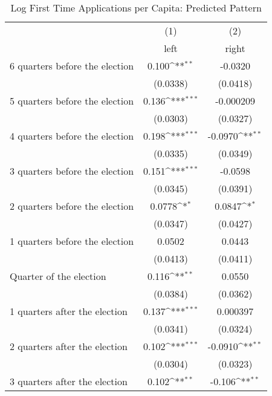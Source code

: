 \begin{table}[htbp]\centering
\def\sym#1{\ifmmode^{#1}\else\(^{#1}\)\fi}
\caption{Log First Time Applications per Capita: Predicted Pattern}
\begin{tabular}{l*{2}{c}}
\hline\hline
                    &\multicolumn{1}{c}{(1)}&\multicolumn{1}{c}{(2)}\\
                    &\multicolumn{1}{c}{left}&\multicolumn{1}{c}{right}\\
\hline
 6 quarters before the election&       0.100\sym{**} &     -0.0320         \\
                    &    (0.0338)         &    (0.0418)         \\
[1em]
 5 quarters before the election&       0.136\sym{***}&   -0.000209         \\
                    &    (0.0303)         &    (0.0327)         \\
[1em]
 4 quarters before the election&       0.198\sym{***}&     -0.0970\sym{**} \\
                    &    (0.0335)         &    (0.0349)         \\
[1em]
 3 quarters before the election&       0.151\sym{***}&     -0.0598         \\
                    &    (0.0345)         &    (0.0391)         \\
[1em]
 2 quarters before the election&      0.0778\sym{*}  &      0.0847\sym{*}  \\
                    &    (0.0347)         &    (0.0427)         \\
[1em]
 1 quarters before the election&      0.0502         &      0.0443         \\
                    &    (0.0413)         &    (0.0411)         \\
[1em]
Quarter of the election&       0.116\sym{**} &      0.0550         \\
                    &    (0.0384)         &    (0.0362)         \\
[1em]
 1 quarters after the election&       0.137\sym{***}&    0.000397         \\
                    &    (0.0341)         &    (0.0324)         \\
[1em]
 2 quarters after the election&       0.102\sym{***}&     -0.0910\sym{**} \\
                    &    (0.0304)         &    (0.0323)         \\
[1em]
 3 quarters after the election&       0.102\sym{**} &      -0.106\sym{**} \\

\end{tabular}
\end{table}
